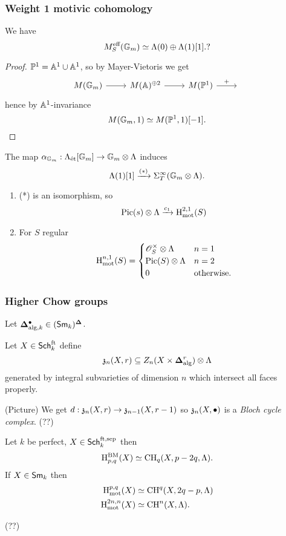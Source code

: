 \subsubsection{Weight 1 motivic cohomology}
\begin{lemma}
We have
\[
M_S^{\text{eff}}(\mathbb{G}_m) \simeq \Lambda(0) \oplus \Lambda(1)[1].?
\]
\end{lemma}
\begin{proof}
$\mathbb{P}^{1}=\mathbb A^{1}\cup \mathbb A^{1}$, so by Mayer-Vietoris we get
\[
\begin{tikzcd}
M(\Gm) \ar[r] & M(\Aff)^{\oplus 2} \ar[r] & M(\P^{1}) \ar[r,"+"] & {}
\end{tikzcd}
\]
hence by $\mathbb A^{1}$-invariance
\[
M(\mathbb{G}_m,1) \simeq M(\mathbb{P}^{1},1)[-1].
\]
\end{proof}
The map $\alpha_{\Gm}:\Lambda_{\text{\'et}}[\Gm]\to \Gm\otimes \Lambda$ induces
\[
\Lambda(1)[1] \xrightarrow{(*)} \Sigma_{T}^{\infty} (\mathbb{G}_m\otimes\Lambda).
\]
\begin{theorem}\leavevmode
\begin{enumerate}[1)]
\item (*) is an isomorphism, so
\[
\operatorname{Pic}(s)\otimes \Lambda \xrightarrow{c_1} \mathrm{H}_{\text{mot}}^{2,1}(S)
\]
\item For $S$ regular
\[
\mathrm{H}_{\text{mot}}^{n,1}(S) =
\begin{cases}
\mathscr{O}_S^{\times }\otimes\Lambda & n=1 \\
\operatorname{Pic}(S)\otimes\Lambda & n=2 \\
0 & \text{otherwise}.
\end{cases}
\]
\end{enumerate}
\end{theorem}
\subsubsection{Higher Chow groups}
Let $\mathbf{\Delta}_{\text{alg},k}^{\bullet}\in (\mathsf{Sm}_k)^{\mathbf{\Delta}}$.
\begin{definition}
Let $X\in \mathsf{Sch}_k^{\text{ft}}$ define
\[
\mathfrak{z}_n(X,r) \subseteq Z_n(X\times \mathbf{\Delta}_{\text{alg}}^{r})\otimes\Lambda
\]
generated by integral subvarieties of dimension $n$ which intersect all faces properly.
\end{definition}
(Picture) We get $d:\kz_n(X,r)\to \kz_{n-1}(X,r-1)$ so $\mathfrak{z}_n(X,\bullet)$ is a
\emph{Bloch cycle complex}.
(??)

\begin{theorem}
Let $k$ be perfect, $X\in \mathsf{Sch}_k^{\text{ft,sep}}$ then
\[
\mathrm{H}_{p,q}^{\text{BM}}(X)\simeq \operatorname{CH}_q(X,p-2q,\Lambda).
\]
If $X\in \mathsf{Sm}_k$ then
\begin{align*}
\mathrm{H}^{p,q}_{\text{mot}}(X) &\simeq \operatorname{CH}^{q}(X,2q-p,\Lambda) \\
\mathrm{H}_{\text{mot}}^{2n,n}(X) &\simeq \operatorname{CH}^{n}(X,\Lambda).
\end{align*}
\end{theorem}
(??)

